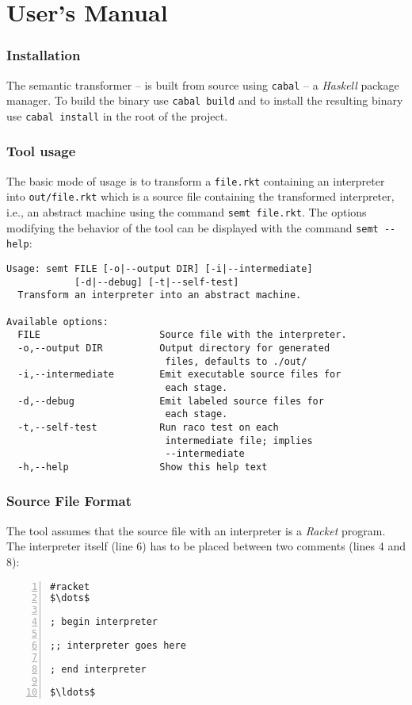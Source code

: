 \chapter{User's Manual}\label{chapter:user-manual}
\subsection*{Installation}
The semantic transformer -- \semt{} is built from source using \lstinline!cabal! -- a \textit{Haskell} package manager.
To build the binary use \lstinline!cabal build! and to install the resulting binary use \lstinline!cabal install! in the root of the project.

\subsection*{Tool usage}
The basic mode of usage is to transform a \lstinline!file.rkt! containing an interpreter into \lstinline!out/file.rkt! which is a source file containing the transformed interpreter, i.e., an abstract machine using the command \lstinline!semt file.rkt!.
The options modifying the behavior of the tool can be displayed with the command \lstinline!semt --help!:
\begin{lstlisting}
Usage: semt FILE [-o|--output DIR] [-i|--intermediate] 
            [-d|--debug] [-t|--self-test]
  Transform an interpreter into an abstract machine.

Available options:
  FILE                     Source file with the interpreter.
  -o,--output DIR          Output directory for generated
                            files, defaults to ./out/
  -i,--intermediate        Emit executable source files for
                            each stage.
  -d,--debug               Emit labeled source files for
                            each stage.
  -t,--self-test           Run raco test on each
                            intermediate file; implies
                            --intermediate
  -h,--help                Show this help text
\end{lstlisting}

\subsection*{Source File Format}
The tool assumes that the source file with an interpreter is a \textit{Racket} program.
The interpreter itself (line 6) has to be placed between two comments (lines 4 and 8):
\begin{lstlisting}[numbers=left]
#racket
$\dots$

; begin interpreter

;; interpreter goes here

; end interpreter

$\ldots$
\end{lstlisting}

